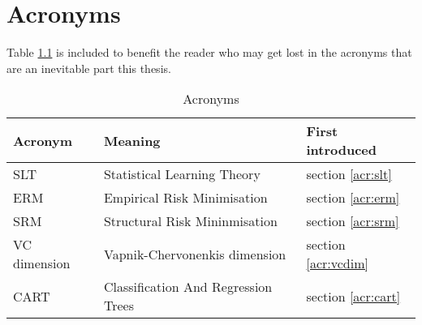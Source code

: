 \chapter{Acronyms}

Table \ref{tbl:acronyms} is included to benefit the reader who may
get lost in the acronyms that are an inevitable part this thesis.

\begin{table}
\begin{tabular}{l l l}

\bf{Acronym} & \bf{Meaning} & \bf{First introduced} \\ \hline \hline

SLT	& Statistical Learning Theory 	& section \ref{acr:slt} \\
ERM	& Empirical Risk Minimisation 	& section \ref{acr:erm} \\
SRM	& Structural Risk Mininmisation & section \ref{acr:srm} \\
VC dimension & Vapnik-Chervonenkis dimension & section \ref{acr:vcdim} \\
CART	& Classification And Regression Trees & section \ref{acr:cart} \\
\hline

\end{tabular}
\caption{Acronyms}
\label{tbl:acronyms}
\end{table}

